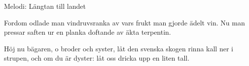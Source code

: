 \begin{song}

\begin{songmeta}
Melodi: Längtan till landet
\end{songmeta}

\begin{songtext}
Fordom odlade man vindruvsranka
av vars frukt man gjorde ädelt vin.
Nu man pressar saften ur en planka
doftande av äkta terpentin.

Höj nu bägaren, o broder och syster,
låt den svenska skogen rinna kall
ner i strupen, och om du är dyster:
låt oss dricka upp en liten tall.
\end{songtext}

\end{song}
